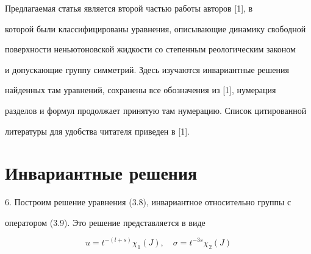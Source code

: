 




\pagestyle{plain} %













\maketitle


\label{begin}


Предлагаемая статья является второй частью работы авторов [1], в


которой были классифицированы уравнения, описывающие динамику свободной


поверхности неньютоновской жидкости со степенным реологическим законом


и допускающие группу симметрий. Здесь изучаются инвариантные решения


найденных там уравнений, сохранены все обозначения из [1], нумерация


разделов и формул продолжает принятую там нумерацию. Список цитированной


литературы для удобства читателя приведен в [1].


\addtocounter{section}{2}





\section{Инвариантные решения}


\addtocounter{section}{3}





6. Построим решение уравнения (3.8), инвариантное относительно группы с


оператором (3.9). Это решение представляется в виде


\begin{equation}


u=t^{-(l+s)}\chi_1(J),\quad \sigma=t^{-3s}\chi_2(J)


\end{equation}



